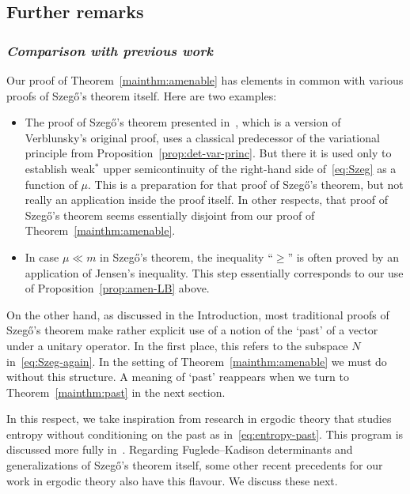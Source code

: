 \documentclass[12pt,a4paper]{article}
\numberwithin{equation}{section}
\theoremstyle{remark}
\begin{document}
\subsection{Further remarks}\label{subs:A-rmks}

\subsubsection*{\emph{Comparison with previous work}}

Our proof of Theorem~\ref{mainthm:amenable} has elements in common with various proofs of Szeg\H{o}'s theorem itself.  Here are two examples:
\begin{itemize}
\item The proof of Szeg\H{o}'s theorem presented in~\cite[Sec. 2.3]{SimOPUCI}, which is a version of Verblunsky's original proof, uses a classical predecessor of the variational principle from Proposition~\ref{prop:det-var-princ}.  But there it is used only to establish weak$^\ast$ upper semicontinuity of the right-hand side of~\eqref{eq:Szeg} as a function of $\mu$.  This is a preparation for that proof of Szeg\H{o}'s theorem, but not really an application inside the proof itself.  In other respects, that proof of Szeg\H{o}'s theorem seems essentially disjoint from our proof of Theorem~\ref{mainthm:amenable}.

\item In case $\mu \ll m$ in Szeg\H{o}'s theorem, the inequality ``$\ge$'' is often proved by an application of Jensen's inequality.  This step essentially corresponds to our use of Proposition~\ref{prop:amen-LB} above.
\end{itemize}

On the other hand, as discussed in the Introduction, most traditional proofs of Szeg\H{o}'s theorem make rather explicit use of a notion of the `past' of a vector under a unitary operator.  In the first place, this refers to the subspace $N$ in~\eqref{eq:Szeg-again}.  In the setting of Theorem~\ref{mainthm:amenable} we must do without this structure.  A meaning of `past' reappears when we turn to Theorem~\ref{mainthm:past} in the next section.

In this respect, we take inspiration from research in ergodic theory that studies entropy without conditioning on the past as in~\eqref{eq:entropy-past}.  This program is discussed more fully in~\cite{GlaThoWei00}. Regarding Fuglede--Kadison determinants and generalizations of Szeg\H{o}'s theorem itself, some other recent precedents for our work in ergodic theory also have this flavour.  We discuss these next.
\end{document}
